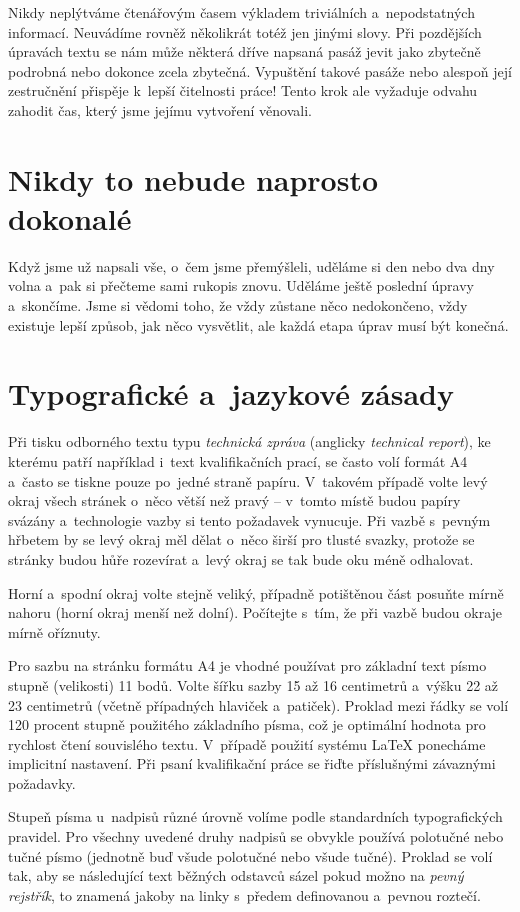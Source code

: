 Nikdy neplýtváme čtenářovým časem výkladem triviálních a~nepodstatných informací. Neuvádíme rovněž několikrát totéž jen jinými slovy. Při pozdějších úpravách textu se nám může některá dříve napsaná pasáž jevit jako zbytečně podrobná nebo dokonce zcela zbytečná. Vypuštění takové pasáže nebo alespoň její zestručnění přispěje k~lepší čitelnosti práce! Tento krok ale vyžaduje odvahu zahodit čas, který jsme jejímu vytvoření věnovali. 


\chapter{Nikdy to nebude naprosto dokonalé}
Když jsme už napsali vše, o~čem jsme přemýšleli, uděláme si den nebo dva dny volna a~pak si přečteme sami rukopis znovu. Uděláme ještě poslední úpravy a~skončíme. Jsme si vědomi toho, že vždy zůstane něco nedokončeno, vždy existuje lepší způsob, jak něco vysvětlit, ale každá etapa úprav musí být konečná.


\chapter{Typografické a~jazykové zásady}
Při tisku odborného textu typu {\it technická zpráva} (anglicky {\it technical report}), ke kterému patří například i~text kvalifikačních prací, se často volí formát A4 a~často se tiskne pouze po~jedné straně papíru. V~takovém případě volte levý okraj všech stránek o~něco větší než pravý -- v~tomto místě budou papíry svázány a~technologie vazby si tento požadavek vynucuje. Při vazbě s~pevným hřbetem by se levý okraj měl dělat o~něco širší pro tlusté svazky, protože se stránky budou hůře rozevírat a~levý okraj se tak bude oku méně odhalovat.

Horní a~spodní okraj volte stejně veliký, případně potištěnou část posuňte mírně nahoru (horní okraj menší než dolní). Počítejte s~tím, že při vazbě budou okraje mírně oříznuty.

Pro sazbu na stránku formátu A4 je vhodné používat pro základní text písmo stupně (velikosti) 11 bodů. Volte šířku sazby 15 až 16 centimetrů a~výšku 22 až 23 centimetrů (včetně případných hlaviček a~patiček). Proklad mezi řádky se volí 120 procent stupně použitého základního písma, což je optimální hodnota pro rychlost čtení souvislého textu. V~případě použití systému LaTeX ponecháme implicitní nastavení. Při psaní kvalifikační práce se řiďte příslušnými závaznými požadavky.

Stupeň písma u~nadpisů různé úrovně volíme podle standardních typografických pravidel. 
Pro všechny uvedené druhy nadpisů se obvykle používá polotučné nebo tučné písmo (jednotně buď všude polotučné nebo všude tučné). Proklad se volí tak, aby se následující text běžných odstavců sázel pokud možno na {\it pevný rejstřík}, to znamená jakoby na linky s~předem definovanou a~pevnou roztečí.

